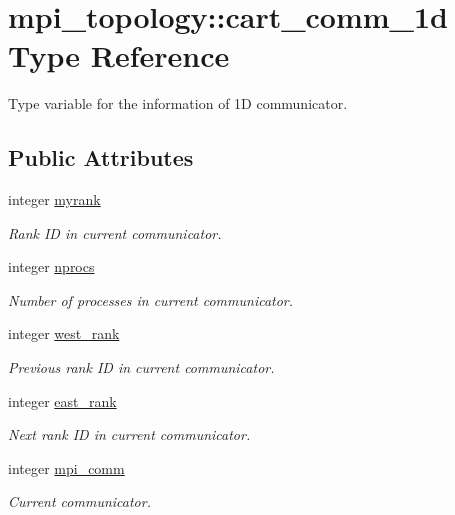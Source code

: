 \hypertarget{structmpi__topology_1_1cart__comm__1d}{}\section{mpi\+\_\+topology\+::cart\+\_\+comm\+\_\+1d Type Reference}
\label{structmpi__topology_1_1cart__comm__1d}


Type variable for the information of 1D communicator.  


\subsection*{Public Attributes}
\begin{DoxyCompactItemize}
\item 
integer \mbox{\hyperlink{structmpi__topology_1_1cart__comm__1d_a0b76696fcf5c27f5cfdc48e53a2671ef}{myrank}}
\begin{DoxyCompactList}\small\item\em Rank ID in current communicator. \end{DoxyCompactList}\item 
integer \mbox{\hyperlink{structmpi__topology_1_1cart__comm__1d_adf78d1be6ca59cada6cc444edde4c3fc}{nprocs}}
\begin{DoxyCompactList}\small\item\em Number of processes in current communicator. \end{DoxyCompactList}\item 
integer \mbox{\hyperlink{structmpi__topology_1_1cart__comm__1d_a63baa1f74126ffda0b67af1c487dcd45}{west\+\_\+rank}}
\begin{DoxyCompactList}\small\item\em Previous rank ID in current communicator. \end{DoxyCompactList}\item 
integer \mbox{\hyperlink{structmpi__topology_1_1cart__comm__1d_a550b10f02ed0c5a8469174df8b54f525}{east\+\_\+rank}}
\begin{DoxyCompactList}\small\item\em Next rank ID in current communicator. \end{DoxyCompactList}\item 
integer \mbox{\hyperlink{structmpi__topology_1_1cart__comm__1d_ab9d9b0c2f72db4fb74c0264691778a45}{mpi\+\_\+comm}}
\begin{DoxyCompactList}\small\item\em Current communicator. \end{DoxyCompactList}\end{DoxyCompactItemize}


